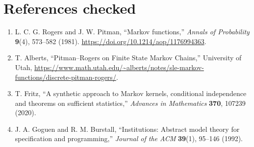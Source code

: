 \documentclass[11pt,letterpaper]{article}
\begin{document}
\section*{References checked}
\begin{enumerate}[label={\arabic*.},leftmargin=19pt]
\item L. C. G. Rogers and J. W. Pitman, ``Markov functions,'' \emph{Annals of Probability} \textbf{9}(4), 573--582 (1981). \url{https://doi.org/10.1214/aop/1176994363}.
\item T. Alberts, ``Pitman--Rogers on Finite State Markov Chains,'' University of Utah, \url{https://www.math.utah.edu/~alberts/notes/sle-markov-functions/discrete-pitman-rogers/}.
\item T. Fritz, ``A synthetic approach to Markov kernels, conditional independence and theorems on sufficient statistics,'' \emph{Advances in Mathematics} \textbf{370}, 107239 (2020).
\item J. A. Goguen and R. M. Burstall, ``Institutions: Abstract model theory for specification and programming,'' \emph{Journal of the ACM} \textbf{39}(1), 95--146 (1992).
\end{enumerate}
\end{document}
